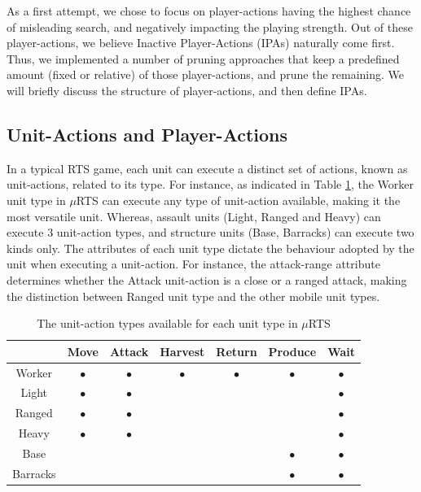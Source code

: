 \documentclass[conference]{IEEEtran}
\newcommand{\mRTS}{$\mu$RTS}
\begin{document}
As a first attempt, we chose to focus on player-actions having the highest chance of misleading search, and negatively impacting the playing strength. Out of these player-actions, we believe Inactive Player-Actions (IPAs) naturally come first. Thus, we implemented a number of pruning approaches that keep a predefined amount (fixed or relative) of those player-actions, and prune the remaining. We will briefly discuss the structure of player-actions, and then define IPAs.

\subsection{Unit-Actions and Player-Actions}

In a typical RTS game, each unit can execute a distinct set of actions, known as unit-actions, related to its type. For instance, as indicated in Table \ref{unitActionsTable}, the Worker unit type in \mRTS{} can execute any type of unit-action available, making it the most versatile unit. Whereas, assault units (Light, Ranged and Heavy) can execute 3 unit-action types, and structure units (Base, Barracks) can execute two kinds only. The attributes of each unit type dictate the behaviour adopted by the unit when executing a unit-action. For instance, the attack-range attribute determines whether the Attack unit-action is a close or a ranged attack, making the distinction between Ranged unit type and the other mobile unit types.

\begin{table}[!h]
\renewcommand{\arraystretch}{1.3}
\caption{The unit-action types available for each unit type in \mRTS{}}
\label{unitActionsTable}
\centering
\begin{tabular}{|c|c|c|c|c|c|c|}
\cline{2-7}
\multicolumn{1}{c|}{} & Move & Attack & Harvest & Return & Produce & Wait \\
\hline
Worker   & $\bullet$ & $\bullet$ & $\bullet$ & $\bullet$ & $\bullet$ & $\bullet$ \\
Light    & $\bullet$ & $\bullet$ & & & & $\bullet$ \\
Ranged   & $\bullet$ & $\bullet$ & & & & $\bullet$ \\
Heavy    & $\bullet$ & $\bullet$ & & & & $\bullet$ \\
Base     & & & & & $\bullet$ & $\bullet$ \\
Barracks & & & & & $\bullet$ & $\bullet$ \\
\hline
\end{tabular}
\end{table}
\end{document}
